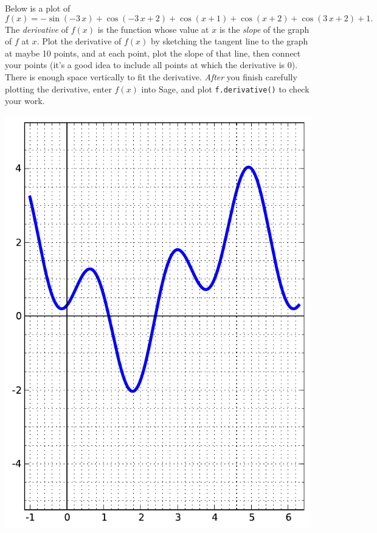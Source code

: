 Below is a plot of $$f(x)=-\sin\left(-3 \, x\right) + \cos\left(-3 \, x + 2\right) + \cos\left(x + 1\right) + \cos\left(x + 2\right) + \cos\left(3 \, x + 2\right) + 1.$$  The {\em \color{red}derivative} of $f(x)$ is the function whose value at $x$ is the {\em slope} of the graph of $f$ at $x$.  Plot the derivative of $f(x)$ by sketching the tangent line to the graph at maybe 10 points, and at each point, plot the slope of that line, then connect your points (it's a good idea to include all points at which the derivative is 0).  There is enough space vertically to fit the derivative.  {\em After} you finish carefully plotting the derivative, enter $f(x)$ into Sage, and plot {\color{blue}\verb|f.derivative()|} to check your work.
\begin{center}\includegraphics{functions/35.pdf}\end{center}\newpage


